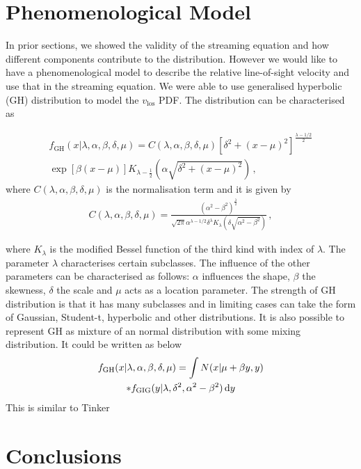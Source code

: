 \documentclass[a4paper,fleqn,usenatbib]{mnras}
\begin{document}
	\section{Phenomenological Model}

	In prior sections, we showed the validity of the streaming equation and how different components contribute to the distribution. However we would like to have a phenomenological model to describe the relative line-of-sight velocity and use that in the streaming equation. We were able to use generalised hyperbolic (GH) distribution to model the $v_{\mathrm{los}}$ PDF. The distribution can be characterised as
	
	\begin{multline}
		f_{\mathrm{GH}}(x|\lambda, \alpha,\beta,\delta,\mu) = C\left(\lambda, \alpha,\beta,\delta,\mu\right) \left[\delta^2+\left(x-\mu\right)^2\right]^{\frac{\lambda-1/2}{2}}  \\
		\exp\left[\beta\left(x-\mu\right)\right] K_{\lambda-\frac{1}{2}}\left(\alpha\sqrt{\delta^2+(x-\mu)^2}\right) \, ,
	\end{multline}
	\noindent where $C\left(\lambda, \alpha,\beta,\delta,\mu\right)$ is the normalisation term and it is given by
	\begin{eqnarray}
		C\left(\lambda, \alpha,\beta,\delta,\mu\right) = \frac{\left(\alpha^2-\beta^2\right)^{\frac{\lambda}{2}}}{\sqrt{2\pi}\alpha^{\lambda - 1/2}\delta^\lambda K_{\lambda}\left(\delta\sqrt{\alpha^2-\beta^2}\right)}  \, ,
	\end{eqnarray}
	
	\noindent where $K_{\lambda}$ is the modified Bessel function of the third kind with index of $\lambda$. The parameter $\lambda$ characterises certain subclasses. The influence of the other parameters can be characterised as follows: $\alpha$ influences the shape, $\beta$ the skewness, $\delta$ the scale and $\mu$ acts as a location parameter. The strength of GH distribution is that it has many subclasses and in limiting cases can take the form of Gaussian, Student-t, hyperbolic and other distributions. It is also possible to represent GH as mixture of an normal distribution with some mixing distribution. It could be written as below
	\begin{multline}
		f_{\mathrm{GH}}(x|\lambda, \alpha,\beta,\delta,\mu) = \int  N(x | \mu + \beta y, y) \\
		* f_{\mathrm{GIG}}(y | \lambda, \delta^2, \alpha^2-\beta^2) \dif y
	\end{multline}
	This is similar to Tinker
	\section{Conclusions}
	
\end{document}
